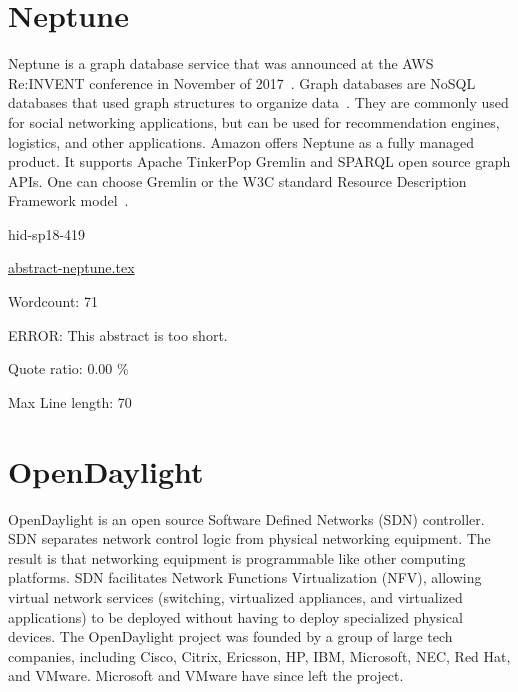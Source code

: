 \section{Neptune}

Neptune is a graph database service that was announced at the AWS
Re:INVENT conference in November of
2017~\cite{hid-sp18-419-www-tc_neptune}. Graph databases are NoSQL
databases that used graph structures to organize
data~\cite{hid-sp18-419-www-tp-graph-db}. They are commonly used for
social networking applications, but can be used for recommendation
engines, logistics, and other applications. Amazon offers Neptune as a
fully managed product. It supports Apache TinkerPop Gremlin and SPARQL
open source graph APIs. One can choose Gremlin or the W3C standard
Resource Description Framework
model~\cite{hid-sp18-419-www-aws-neptune}.


\begin{IU}

hid-sp18-419

\href{https://github.com/cloudmesh-community/hid-sp18-419/blob/master//technology/abstract-neptune.tex}{abstract-neptune.tex}

 

Wordcount: 71

ERROR: This abstract is too short.


Quote ratio: 0.00 \%
 
Max Line length: 70
\end{IU}

\section{OpenDaylight}

OpenDaylight is an open source Software Defined Networks (SDN)
controller\cite{hid-sp18-419-www-opendaylight}. SDN separates network
control logic from physical networking equipment. The result is that
networking equipment is programmable like other computing
platforms. SDN facilitates Network Functions Virtualization (NFV),
allowing virtual network services (switching, virtualized appliances,
and virtualized applications) to be deployed without having to deploy
specialized physical devices\cite{hid-sp18-419-www-cio-sdn-nfv}. The
OpenDaylight project was founded by a group of large tech companies,
including Cisco, Citrix, Ericsson, HP, IBM, Microsoft, NEC, Red Hat,
and VMware. Microsoft and VMware have since left the
project\cite{hid-sp18-419-www-sdx-odl}.


